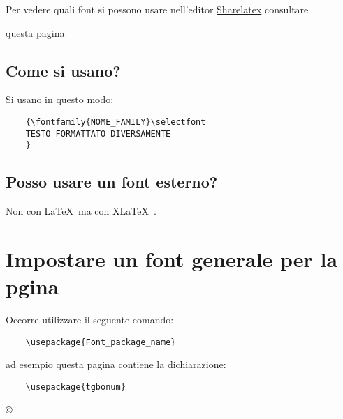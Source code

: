 \documentclass[a4paper, 11p]{article}
\begin{document}
Per vedere quali font si possono usare nell'editor \href{http://www.it.sharelatex.com}{Sharelatex} consultare

{\selectfont
\href{https://it.sharelatex.com/learn/Font_typefaces}{questa pagina}
}



\subsection{Come si usano?}

Si usano in questo modo:
\begin{verbatim}
    {\fontfamily{NOME_FAMILY}\selectfont
    TESTO FORMATTATO DIVERSAMENTE
    }
\end{verbatim}


\subsection{Posso usare un
{\selectfont
font
} %
esterno?
}

Non con \LaTeX\ ma con X\LaTeX\ .



\vspace{1cm}

\section{Impostare un font generale per la pgina}
Occorre utilizzare il seguente comando:
\begin{verbatim}
    \usepackage{Font_package_name}
\end{verbatim}

ad esempio questa pagina contiene la dichiarazione:

\begin{verbatim}
    \usepackage{tgbonum}
\end{verbatim}


\vspace{4cm}
\begin{center}
{\selectfont
\copyright {}
}
\end{center}
\end{document}

